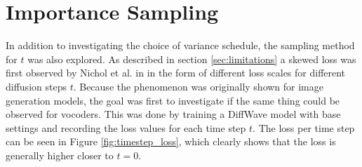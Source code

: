 \documentclass{report}
\begin{document}

\section{Importance Sampling} \label{sec:imps}

In addition to investigating the choice of variance schedule, the sampling method for $t$ was also explored. As described in section \ref{sec:limitations} a skewed loss was first observed by Nichol et al. in \cite{nichol2021improved} in the form of different loss scales for different diffusion steps $t$. Because the phenomenon was originally shown for image generation models, the goal was first to investigate if the same thing could be observed for vocoders. This was done by training a DiffWave model with base settings and recording the loss values for each time step $t$. The loss per time step can be seen in Figure \ref{fig:timestep_loss}, which clearly shows that the loss is generally higher closer to $t=0$.
\end{document}
